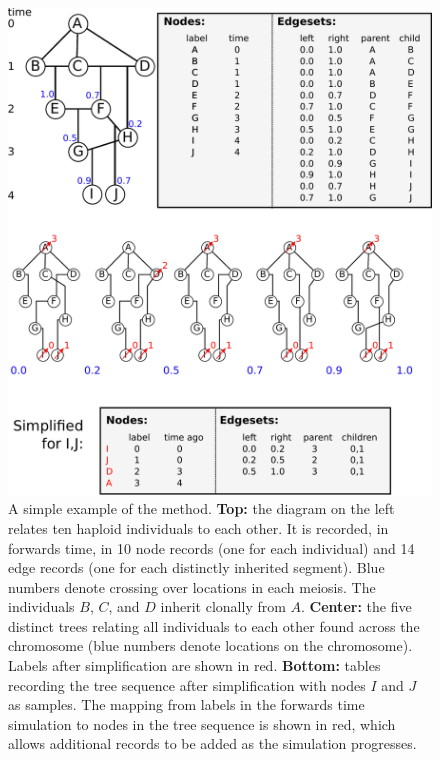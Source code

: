 \documentclass{article}
\begin{document}
\begin{figure}
    \begin{center}
        \includegraphics{method_diagram}
    \end{center}
    \caption{
        A simple example of the method.
        \textbf{Top:} the diagram on the left relates ten haploid individuals to each other.
        It is recorded, in forwards time,
        in 10 node records (one for each individual)
        and 14 edge records (one for each distinctly inherited segment).
        Blue numbers denote crossing over locations in each meiosis.
        The individuals $B$, $C$, and $D$ inherit clonally from $A$.
        \textbf{Center:} the five distinct trees relating all individuals to each other
        found across the chromosome (blue numbers denote locations on the chromosome).
        Labels after simplification are shown in red.
        \textbf{Bottom:} tables recording the tree sequence after simplification
        with nodes $I$ and $J$ as samples.
        The mapping from labels in the forwards time simulation to nodes in the tree sequence
        is shown in red,
        which allows additional records to be added as the simulation progresses.
        \label{fig:method_diagram}
    }
\end{figure}
\end{document}
